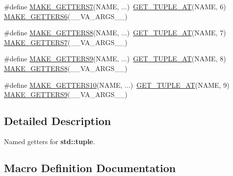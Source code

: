 \begin{DoxyCompactItemize}
\item 
\#define \hyperlink{group__NamedTupleGroupFuncs_gac6784b917534a8d68f6eefd2c5d39fa3}{M\+A\+K\+E\+\_\+\+G\+E\+T\+T\+E\+R\+S7}(N\+A\+ME, ...)~\hyperlink{group__NamedTupleGroupFuncs_ga970484fe66e17af41a99b334e59f01d8}{G\+E\+T\+\_\+\+T\+U\+P\+L\+E\+\_\+\+AT}(N\+A\+ME, 6)  \hyperlink{group__NamedTupleGroupFuncs_ga387121cc41c9467e0c55d554cc179eed}{M\+A\+K\+E\+\_\+\+G\+E\+T\+T\+E\+R\+S6}(\+\_\+\+\_\+\+V\+A\+\_\+\+A\+R\+G\+S\+\_\+\+\_\+)
\item 
\#define \hyperlink{group__NamedTupleGroupFuncs_ga28af99ba6ba08591b3babc12c3f56dc3}{M\+A\+K\+E\+\_\+\+G\+E\+T\+T\+E\+R\+S8}(N\+A\+ME, ...)~\hyperlink{group__NamedTupleGroupFuncs_ga970484fe66e17af41a99b334e59f01d8}{G\+E\+T\+\_\+\+T\+U\+P\+L\+E\+\_\+\+AT}(N\+A\+ME, 7)  \hyperlink{group__NamedTupleGroupFuncs_gac6784b917534a8d68f6eefd2c5d39fa3}{M\+A\+K\+E\+\_\+\+G\+E\+T\+T\+E\+R\+S7}(\+\_\+\+\_\+\+V\+A\+\_\+\+A\+R\+G\+S\+\_\+\+\_\+)
\item 
\#define \hyperlink{group__NamedTupleGroupFuncs_ga7702fad61cbcd595eca8209c5432f4f3}{M\+A\+K\+E\+\_\+\+G\+E\+T\+T\+E\+R\+S9}(N\+A\+ME, ...)~\hyperlink{group__NamedTupleGroupFuncs_ga970484fe66e17af41a99b334e59f01d8}{G\+E\+T\+\_\+\+T\+U\+P\+L\+E\+\_\+\+AT}(N\+A\+ME, 8)  \hyperlink{group__NamedTupleGroupFuncs_ga28af99ba6ba08591b3babc12c3f56dc3}{M\+A\+K\+E\+\_\+\+G\+E\+T\+T\+E\+R\+S8}(\+\_\+\+\_\+\+V\+A\+\_\+\+A\+R\+G\+S\+\_\+\+\_\+)
\item 
\#define \hyperlink{group__NamedTupleGroupFuncs_ga4aaa6053b687c98cba96dc1d9cb1400e}{M\+A\+K\+E\+\_\+\+G\+E\+T\+T\+E\+R\+S10}(N\+A\+ME, ...)~\hyperlink{group__NamedTupleGroupFuncs_ga970484fe66e17af41a99b334e59f01d8}{G\+E\+T\+\_\+\+T\+U\+P\+L\+E\+\_\+\+AT}(N\+A\+ME, 9)  \hyperlink{group__NamedTupleGroupFuncs_ga7702fad61cbcd595eca8209c5432f4f3}{M\+A\+K\+E\+\_\+\+G\+E\+T\+T\+E\+R\+S9}(\+\_\+\+\_\+\+V\+A\+\_\+\+A\+R\+G\+S\+\_\+\+\_\+)
\end{DoxyCompactItemize}


\subsection{Detailed Description}
Named getters for {\bf std\+::tuple}. 



\subsection{Macro Definition Documentation}
